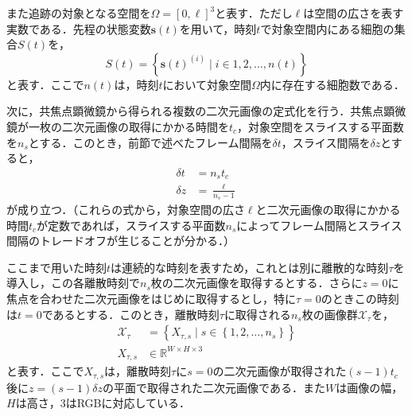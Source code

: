 また追跡の対象となる空間を$\Omega = \left[0, \ell\right]^3$と表す．ただし$\ell$は空間の広さを表す実数である．先程の状態変数$\bm{s}(t)$を用いて，時刻$t$で対象空間内にある細胞の集合$S(t)$を，
\begin{equation}
    \label{eq:set_of_cells_at_time}
    S(t) = \left\{\bm{s}(t)^{(i)} \mid i \in 1,2,\dots,n(t)\right\}
\end{equation}
と表す．ここで$n(t)$は，時刻$t$において対象空間$\Omega$内に存在する細胞数である．

次に，共焦点顕微鏡から得られる複数の二次元画像の定式化を行う．共焦点顕微鏡が一枚の二次元画像の取得にかかる時間を$t_c$，対象空間をスライスする平面数を$n_s$とする．このとき，前節で述べたフレーム間隔を$\delta t$，スライス間隔を$\delta z$とすると，
\begin{equation}
    \label{eq:delta_time_and_z}
    \begin{aligned}
        \delta t &= n_s  t_c
        \\ \delta z &= \frac{\ell}{n_s - 1}
    \end{aligned}
\end{equation}
が成り立つ．（これらの式から，対象空間の広さ$\ell$と二次元画像の取得にかかる時間$t_c$が定数であれば，スライスする平面数$n_s$によってフレーム間隔とスライス間隔のトレードオフが生じることが分かる．）

ここまで用いた時刻$t$は連続的な時刻を表すため，これとは別に離散的な時刻$\tau$を導入し，この各離散時刻で$n_s$枚の二次元画像を取得するとする．さらに$z = 0$に焦点を合わせた二次元画像をはじめに取得するとし，特に$\tau = 0$のときこの時刻は$t = 0$であるとする．このとき，離散時刻$\tau$に取得される$n_s$枚の画像群$\mathcal{X}_{\tau}$を，
\begin{equation}
    \label{eq:sliced_images}
    \begin{aligned}
        \mathcal{X}_{\tau} &= \left\{X_{\tau, s} \mid s \in \left\{1, 2, \dots, n_s\right\}\right\}
        \\ X_{\tau, s} &\in \mathbb{R}^{W \times H \times 3}
    \end{aligned}
\end{equation}
と表す．ここで$X_{\tau, s}$は，離散時刻$\tau$に$s = 0$の二次元画像が取得された$(s - 1) t_c$後に$z = (s - 1) \delta z$の平面で取得された二次元画像である．また$W$は画像の幅，$H$は高さ，$3$はRGBに対応している．

